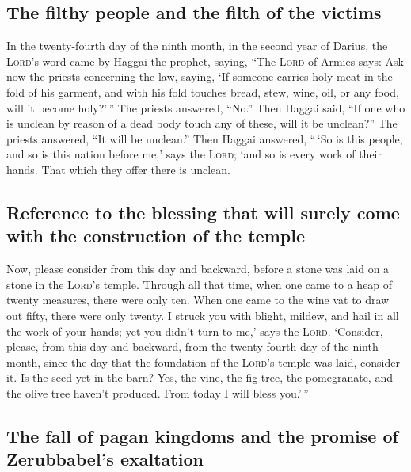 \hypertarget{the-filthy-people-and-the-filth-of-the-victims}{%
\subsection{The filthy people and the filth of the
victims}\label{the-filthy-people-and-the-filth-of-the-victims}}

 In the twenty-fourth day of the ninth month, in the
second year of Darius, the \textsc{Lord}'s word came by Haggai the
prophet, saying,  ``The \textsc{Lord} of Armies says: Ask
now the priests concerning the law, saying,  `If someone
carries holy meat in the fold of his garment, and with his fold touches
bread, stew, wine, oil, or any food, will it become holy?'\,'' The
priests answered, ``No.''  Then Haggai said, ``If one who
is unclean by reason of a dead body touch any of these, will it be
unclean?'' The priests answered, ``It will be unclean.'' 
Then Haggai answered, ``\,`So is this people, and so is this nation
before me,' says the \textsc{Lord}; `and so is every work of their
hands. That which they offer there is unclean.

\hypertarget{reference-to-the-blessing-that-will-surely-come-with-the-construction-of-the-temple}{%
\subsection{Reference to the blessing that will surely come with the
construction of the
temple}\label{reference-to-the-blessing-that-will-surely-come-with-the-construction-of-the-temple}}

 Now, please consider from this day and backward, before
a stone was laid on a stone in the \textsc{Lord}'s temple.
 Through all that time, when one came to a heap of twenty
measures, there were only ten. When one came to the wine vat to draw out
fifty, there were only twenty.  I struck you with blight,
mildew, and hail in all the work of your hands; yet you didn't turn to
me,' says the \textsc{Lord}.  `Consider, please, from
this day and backward, from the twenty-fourth day of the ninth month,
since the day that the foundation of the \textsc{Lord}'s temple was
laid, consider it.  Is the seed yet in the barn? Yes, the
vine, the fig tree, the pomegranate, and the olive tree haven't
produced. From today I will bless you.'\,''

\hypertarget{the-fall-of-pagan-kingdoms-and-the-promise-of-zerubbabels-exaltation}{%
\subsection{The fall of pagan kingdoms and the promise of Zerubbabel's
exaltation}\label{the-fall-of-pagan-kingdoms-and-the-promise-of-zerubbabels-exaltation}}


